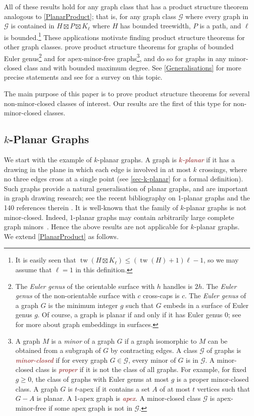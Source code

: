 \documentclass{patmorin}
\newcommand{\defin}[1]{\textcolor{Maroon}{\emph{#1}}}
\DeclareMathOperator{\tw}{tw}
\renewcommand{\geq}{\geqslant}
\renewcommand{\leq}{\leqslant}
\begin{document}
All of these results hold for any graph class that has a product structure theorem analogous to \cref{PlanarProduct}; that is, for any graph class  $\mathcal{G}$ where every graph in $\mathcal{G}$ is contained in $H\boxtimes P\boxtimes K_\ell$ where $H$ has bounded treewidth, $P$ is a path, and $\ell$ is bounded.\footnote{It is easily seen that $\tw(H\boxtimes K_\ell) \leq (\tw(H)+1)\ell-1$, so we may assume that $\ell=1$ in this definition.} These applications motivate finding product structure theorems for other graph classes. \citet{DJMMUW20} prove product structure theorems for graphs of bounded Euler genus\footnote{The \textit{Euler genus} of the orientable surface with $h$ handles is $2h$. The \textit{Euler genus} of the non-orientable surface with $c$ cross-caps is $c$. The \textit{Euler genus} of a graph $G$ is the minimum integer $g$ such that $G$ embeds in a surface of Euler genus $g$. Of course, a graph is planar if and only if it has Euler genus 0; see \citep{mohar.thomassen:graphs} for more about graph embeddings in surfaces.} and for apex-minor-free graphs\footnote{A graph $M$ is a \textit{minor} of a graph $G$ if a graph isomorphic to $M$ can be obtained from a subgraph of $G$ by contracting edges. A class $\mathcal{G}$ of graphs is \defin{minor-closed} if for every graph $G\in\mathcal{G}$, every minor of $G$ is in $\mathcal{G}$. A minor-closed class is \defin{proper} if it is not the class of all graphs. For example, for fixed $g\geq 0$, the class of graphs with Euler genus at most $g$ is a proper minor-closed class. A graph $G$ is $t$-apex if it contains a set $A$ of at most $t$ vertices such that $G-A$ is planar. A 1-apex graph is \defin{apex}.  A minor-closed class $\mathcal{G}$ is apex-minor-free if some apex graph is not in $\mathcal{G}$.}, and \citet{DEMWW22} do so for graphs in any minor-closed class and with bounded maximum degree. See \cref{Generalisations} for more precise statements and see \citep{DHJLW21} for a survey on this topic.

The main purpose of this paper is to prove product structure theorems for several non-minor-closed classes of interest. Our results are the first of this type for non-minor-closed classes.

\subsection{$k$-Planar Graphs}

We start with the example of $k$-planar graphs. A graph is \defin{$k$-planar} if it has a drawing in the plane in which each edge is involved in at most $k$ crossings, where no three edges cross at a single point (see \cref{sec-k-planar} for a formal definition). Such graphs provide a natural generalisation of planar graphs, and are important in graph drawing research; see the recent bibliography on 1-planar graphs and the 140 references therein \citep{kobourov.liotta.ea:annotated}. It is well-known that the family of $k$-planar graphs is not minor-closed.  Indeed, 1-planar graphs may contain arbitrarily large complete graph minors~\citep{dujmovic.eppstein.ea:structure}. Hence the above results are not applicable for  $k$-planar graphs. We extend \cref{PlanarProduct} as follows.
\end{document}
